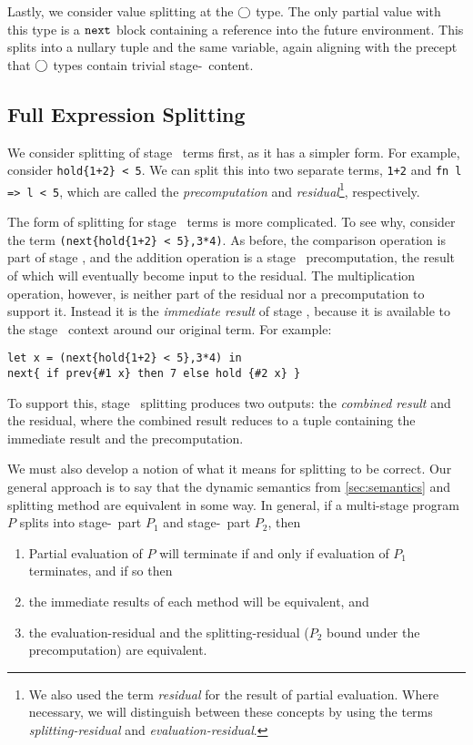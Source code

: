 Lastly, we consider value splitting at the $\bigcirc$ type.  The only partial value with this type
is a ${\tt next}$ block containing a reference into the future environment.  This splits into a 
nullary tuple and the same variable, again aligning with the precept that $\bigcirc$ types contain trivial stage-\bbone\
content.

\subsection{Full Expression Splitting}

We consider splitting of stage \bbtwo\ terms first, as it has a simpler form.  
For example, consider \verb|hold{1+2} < 5|.
We can split this into two separate terms, \verb|1+2| and \verb|fn l => l < 5|, 
which are called the {\em precomputation} and {\em residual}\footnote{We also used the term {\em residual} for the result of partial evaluation.
Where necessary, we will distinguish between these concepts by using the terms {\em splitting-residual}
and {\em evaluation-residual}.}, respectively.  

The form of splitting for stage \bbone\ terms is more complicated.
To see why, consider the term \verb|(next{hold{1+2} < 5},3*4)|.
As before, the comparison operation is part of stage \bbtwo, 
and the addition operation is a stage \bbone\ precomputation, the result of which will eventually become input to the residual.
The multiplication operation, however, is neither part of the residual nor a precomputation to support it.
Instead it is the {\em immediate result} of stage \bbone, 
because it is available to the stage \bbone\ context around our original term.
For example:
\begin{lstlisting}
let x = (next{hold{1+2} < 5},3*4) in
next{ if prev{#1 x} then 7 else hold {#2 x} }
\end{lstlisting}
To support this, stage \bbone\ splitting produces two outputs: the {\em combined result} and the residual,
where the combined result reduces to a tuple containing the immediate result and the precomputation.

We must also develop a notion of what it means for splitting to be correct.  
Our general approach is to say that the dynamic semantics from \ref{sec:semantics} and splitting method are equivalent in some way.  
In general, if a multi-stage program $P$ splits into stage-\bbone\ part $P_1$ and stage-\bbtwo\ part $P_2$, then
\begin{enumerate}
\item Partial evaluation of $P$ will terminate if and only if evaluation of $P_1$ terminates, and if so then
\item the immediate results of each method will be equivalent, and
\item the evaluation-residual and the splitting-residual ($P_2$ bound under the precomputation) are equivalent.
\end{enumerate}

